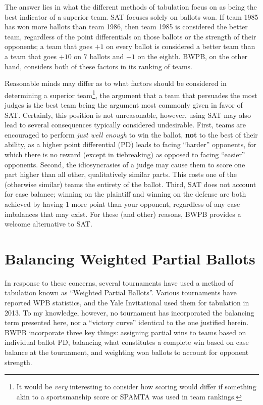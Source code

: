 \documentclass{article}
\begin{document}
The answer lies in what the different methods of tabulation focus on as being the best indicator of a superior team.  SAT focuses solely on ballots won.  If team 1985 has won more ballots than team 1986, then team 1985 is considered the better team, regardless of the point differentials on those ballots or the strength of their opponents; a team that goes $+1$ on every ballot is considered a better team than a team that goes $+10$ on $7$ ballots and $-1$ on the eighth.  BWPB, on the other hand, considers both of these factors in its ranking of teams.

Reasonable minds may differ as to what factors should be considered in determining a superior team\footnote{It would be \textit{very} interesting to consider how scoring would differ if something akin to a sportsmanship score or SPAMTA was used in team rankings.}, the argument that a team that persuades the most judges is the best team being the argument most commonly given in favor of SAT.  Certainly, this position is not unreasonable, however, using SAT may also lead to several consequences typically considered undesirable.  First, teams are encouraged to perform \textit{just well enough} to win the ballot, \textbf{not} to the best of their ability, as a higher point differential (PD) leads to facing ``harder'' opponents, for which there is no reward (except in tiebreaking) as opposed to facing ``easier'' opponents.  Second, the idiosyncrasies of a judge may cause them to score one part higher than all other, qualitatively similar parts.  This costs one of the (otherwise similar) teams the entirety of the ballot.  Third, SAT does not account for case balance; winning on the plaintiff and winning on the defense are both achieved by having $1$ more point than your opponent, regardless of any case imbalances that may exist.  For these (and other) reasons, BWPB provides a welcome alternative to SAT.
\section{Balancing Weighted Partial Ballots}
In response to these concerns, several tournaments have used a method of tabulation known as ``Weighted Partial Ballots''.  Various tournaments have reported WPB statistics, and the Yale Invitational used them for tabulation in 2013.  To my knowledge, however, no tournament has incorporated the balancing term presented here, nor a ``victory curve'' identical to the one justified herein.  BWPB incorporate three key things:  assigning partial wins to teams based on individual ballot PD, balancing what constitutes a complete win based on case balance at the tournament, and weighting won ballots to account for opponent strength.
\end{document}
